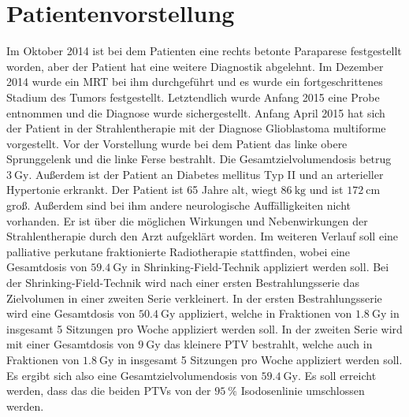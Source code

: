 \section{Patientenvorstellung}
Im Oktober 2014 ist bei dem Patienten eine rechts betonte Paraparese festgestellt worden, aber der Patient hat eine weitere Diagnostik abgelehnt.
Im Dezember 2014 wurde ein MRT bei ihm durchgeführt und es wurde ein fortgeschrittenes Stadium des Tumors festgestellt.
Letztendlich wurde Anfang 2015 eine Probe entnommen und die Diagnose wurde sichergestellt.
Anfang April 2015 hat sich der Patient in der Strahlentherapie mit der Diagnose Glioblastoma multiforme vorgestellt.
Vor der Vorstellung wurde bei dem Patient das linke obere Sprunggelenk und die linke Ferse bestrahlt.
Die Gesamtzielvolumendosis betrug $\SI{3}{\gray}$. Außerdem ist der Patient an Diabetes mellitus Typ II und an arterieller Hypertonie erkrankt.
Der Patient ist 65 Jahre alt, wiegt $\SI{86}{\kilogram}$ und ist $\SI{172}{\centi\meter}$ groß.
Außerdem sind bei ihm andere neurologische Auffälligkeiten nicht vorhanden.
Er ist über die möglichen Wirkungen und Nebenwirkungen der Strahlentherapie durch den Arzt aufgeklärt worden.
Im weiteren Verlauf soll eine palliative perkutane fraktionierte Radiotherapie stattfinden, wobei eine Gesamtdosis von $\SI{59,4}{\gray}$ in
Shrinking-Field-Technik appliziert werden soll. Bei der Shrinking-Field-Technik wird nach einer ersten Bestrahlungsserie das Zielvolumen in
einer zweiten Serie verkleinert.
In der ersten Bestrahlungsserie wird eine Gesamtdosis von $\SI{50,4}{\gray}$ appliziert, welche in Fraktionen von $\SI{1,8}{\gray}$ in
insgesamt 5 Sitzungen pro Woche appliziert werden soll.
In der zweiten Serie wird mit einer Gesamtdosis von $\SI{9}{\gray}$ das kleinere PTV bestrahlt, welche auch in Fraktionen von $\SI{1,8}{\gray}$ in insgesamt
5 Sitzungen pro Woche appliziert werden soll. Es ergibt sich also eine Gesamtzielvolumendosis von  $\SI{59,4}{\gray}$.
Es soll erreicht werden, dass das die beiden PTVs von der $\SI{95}{\percent}$ Isodosenlinie umschlossen werden. 
